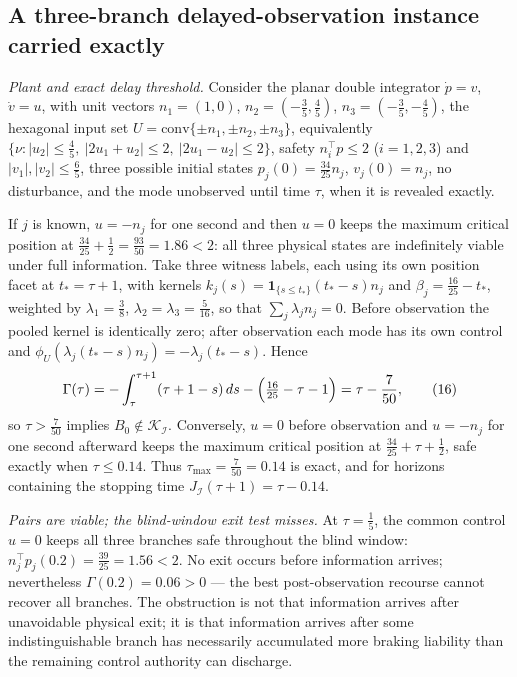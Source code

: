 \documentclass[10pt,twocolumn]{article}
\theoremstyle{plain}
\theoremstyle{definition}
\theoremstyle{remark}
\begin{document}
\subsection{A three-branch delayed-observation instance carried exactly}\label{instance}

\emph{Plant and exact delay threshold.} Consider the planar double integrator
\(\dot p = v\), \(\dot v = u\), with unit vectors \(n_1 = (1,0)\),
\(n_2 = (-\tfrac35, \tfrac45)\), \(n_3 = (-\tfrac35, -\tfrac45)\), the
hexagonal input set
\(U = \mathrm{conv}\{\pm n_1, \pm n_2, \pm n_3\}\), equivalently
\(\{\nu : |u_2| \le \tfrac45,\ |2u_1 + u_2| \le 2,\ |2u_1 - u_2| \le 2\}\),
safety \(n_i^\top p \le 2\) (\(i = 1,2,3\)) and
\(|v_1|, |v_2| \le \tfrac65\), three possible initial states
\(p_j(0) = \tfrac{34}{25} n_j\), \(v_j(0) = n_j\), no disturbance, and the
mode unobserved until time \(\tau\), when it is revealed exactly.

If \(j\) is known, \(u = -n_j\) for one second and then \(u = 0\) keeps the
maximum critical position at \(\tfrac{34}{25} + \tfrac12 = \tfrac{93}{50} =
1.86 < 2\): all three physical states are indefinitely viable under full
information. Take three witness labels, each using its own position facet at
\(t_* = \tau + 1\), with kernels
\(k_j(s) = \mathbf{1}_{\{s \le t_*\}} (t_* - s) n_j\) and
\(\beta_j = \tfrac{16}{25} - t_*\), weighted by \(\lambda_1 = \tfrac38\),
\(\lambda_2 = \lambda_3 = \tfrac{5}{16}\), so that
\(\sum_j \lambda_j n_j = 0\). Before observation the pooled kernel is
identically zero; after observation each mode has its own control and
\(\phi_U(\lambda_j (t_* - s) n_j) = -\lambda_j (t_* - s)\). Hence
\[
\Gamma(\tau) = -\int_\tau^{\tau+1} (\tau + 1 - s)\, ds
- \Bigl(\tfrac{16}{25} - \tau - 1\Bigr) = \tau - \frac{7}{50},
\tag{16}
\]
so \(\tau > \tfrac{7}{50}\) implies
\(B_0 \notin \mathcal{K}_{\mathcal{I}}\). Conversely, \(u = 0\) before
observation and \(u = -n_j\) for one second afterward keeps the maximum
critical position at \(\tfrac{34}{25} + \tau + \tfrac12\), safe exactly when
\(\tau \le 0.14\). Thus \(\tau_{\max} = \tfrac{7}{50} = 0.14\) is exact, and
for horizons containing the stopping time
\(J_{\mathcal{I}}(\tau + 1) = \tau - 0.14\).

\emph{Pairs are viable; the blind-window exit test misses.} At
\(\tau = \tfrac15\), the common control \(u = 0\) keeps all three branches
safe throughout the blind window:
\(n_j^\top p_j(0.2) = \tfrac{39}{25} = 1.56 < 2\). No exit occurs before
information arrives; nevertheless \(\Gamma(0.2) = 0.06 > 0\) --- the best
post-observation recourse cannot recover all branches. The obstruction is
not that information arrives after unavoidable physical exit; it is that
information arrives after some indistinguishable branch has necessarily
accumulated more braking liability than the remaining control authority can
discharge.
\end{document}
